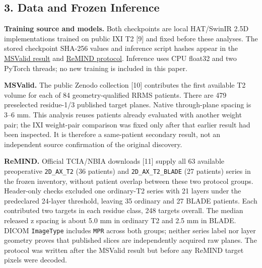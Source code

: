 \documentclass[
]{article}
\begin{document}
\subsection{3. Data and Frozen
Inference}\label{data-and-frozen-inference}

\textbf{Training source and models.} Both checkpoints are local
HAT/SwinIR 2.5D implementations trained on public IXI T2 {[}9{]} and
fixed before these analyses. The stored checkpoint SHA-256 values and
inference script hashes appear in the
\href{MSVALID_IXI_WEIGHTS_SECONDARY_RESULT_2026-10-01.md}{MSValid
result} and
\href{REMIND_NATIVE_T2_CONFIRMATION_PROTOCOL_2026-10-01.md}{ReMIND
protocol}. Inference uses CPU float32 and two PyTorch threads; no new
training is included in this paper.

\textbf{MSValid.} The public Zenodo collection {[}10{]} contributes the
first available T2 volume for each of 84 geometry-qualified RRMS
patients. There are 479 preselected residue-1/3 published target planes.
Native through-plane spacing is 3--6 mm. This analysis reuses patients
already evaluated with another weight pair; the IXI weight-pair
comparison was fixed only after that earlier result had been inspected.
It is therefore a same-patient secondary result, not an independent
source confirmation of the original discovery.

\textbf{ReMIND.} Official TCIA/NBIA downloads {[}11{]} supply all 63
available preoperative \texttt{2D\_AX\_T2} (36 patients) and
\texttt{2D\_AX\_T2\_BLADE} (27 patients) series in the frozen inventory,
without patient overlap between these two protocol groups. Header-only
checks excluded one ordinary-T2 series with 21 layers under the
predeclared 24-layer threshold, leaving 35 ordinary and 27 BLADE
patients. Each contributed two targets in each residue class, 248
targets overall. The median released z spacing is about 5.0 mm in
ordinary T2 and 2.5 mm in BLADE. DICOM \texttt{ImageType} includes
\texttt{MPR} across both groups; neither series label nor layer geometry
proves that published slices are independently acquired raw planes. The
protocol was written after the MSValid result but before any ReMIND
target pixels were decoded.
\end{document}
